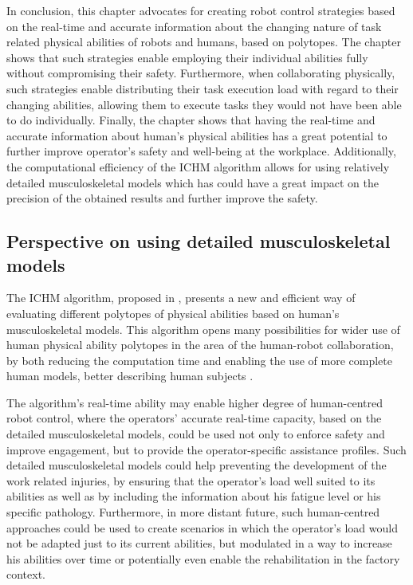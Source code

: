 In conclusion, this chapter advocates for creating robot control strategies based on the real-time and accurate information about the changing nature of task related physical abilities of robots and humans, based on polytopes. The chapter shows that such strategies enable employing their individual abilities fully without compromising their safety. Furthermore, when collaborating physically, such strategies enable distributing their task execution load with regard to their changing abilities, allowing them to execute tasks they would not have been able to do individually. Finally, the chapter shows that having the real-time and accurate information about human's physical abilities has a great potential to further improve operator's safety and well-being at the workplace. Additionally, the computational efficiency of the ICHM algorithm allows for using relatively detailed musculoskeletal models which has could have a great impact on the precision of the obtained results and further improve the safety. 


\subsection{Perspective on using detailed musculoskeletal models}
\label{sec:human_robot_prospective}

The ICHM algorithm, proposed in , presents a new and efficient way of evaluating different polytopes of physical abilities based on human's musculoskeletal models. This algorithm opens many possibilities for wider use of human physical ability polytopes in the area of the human-robot collaboration, by both reducing the computation time and enabling the use of more complete human models, better describing human subjects \cite{sohn2019effects}. 

The algorithm's real-time ability may enable higher degree of human-centred robot control, where the operators' accurate real-time capacity, based on the detailed musculoskeletal models, could be used not only to enforce safety and improve engagement, but to provide the operator-specific assistance profiles. Such detailed musculoskeletal models could help preventing the development of the work related injuries, by ensuring that the operator's load well suited to its abilities as well as by including the information about his fatigue level \cite{Bolghanabadi2014fatigue} or his specific pathology. Furthermore, in more distant future, such human-centred approaches could be used to create scenarios in which the operator's load would not be adapted just to its current abilities, but modulated in a way to increase his abilities over time or potentially even enable the rehabilitation in the factory context. 

